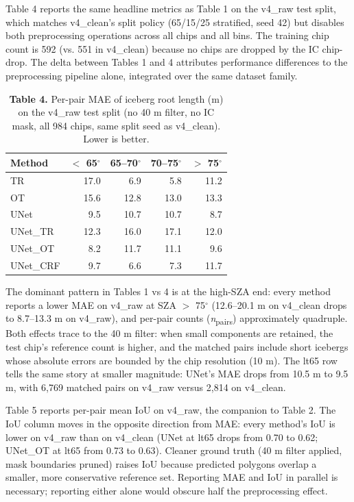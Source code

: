 \documentclass[review,jog]{igs}
\begin{document}
Table 4 reports the same headline metrics as Table 1 on the v4\_raw test split, which matches v4\_clean's split policy (65/15/25 stratified, seed 42) but disables both preprocessing operations across all chips and all bins. The training chip count is 592 (vs. 551 in v4\_clean) because no chips are dropped by the IC chip-drop. The delta between Tables 1 and 4 attributes performance differences to the preprocessing pipeline alone, integrated over the same dataset family.

\begin{table}[h]
\caption{\textbf{Table 4.} Per-pair MAE of iceberg root length (m) on the v4\_raw test split (no 40 m filter, no IC mask, all 984 chips, same split seed as v4\_clean). Lower is better.}
\centering
\begin{tabular}{lrrrr}
\toprule
Method & $<$ 65$^\circ$ & 65--70$^\circ$ & 70--75$^\circ$ & $>$ 75$^\circ$ \\
\midrule
TR        & 17.0           & 6.9            & 5.8            & 11.2 \\
OT        & 15.6           & 12.8           & 13.0           & 13.3 \\
UNet      & 9.5            & 10.7           & 10.7           & 8.7  \\
UNet\_TR  & 12.3           & 16.0           & 17.1           & 12.0 \\
UNet\_OT  & 8.2            & 11.7           & 11.1           & 9.6  \\
UNet\_CRF & 9.7            & 6.6            & 7.3            & 11.7 \\
\bottomrule
\end{tabular}
\end{table}

The dominant pattern in Tables 1 vs 4 is at the high-SZA end: every method reports a lower MAE on v4\_raw at SZA $>$ 75$^\circ$ (12.6--20.1 m on v4\_clean drops to 8.7--13.3 m on v4\_raw), and per-pair counts (\textit{n}\textsubscript{pairs}) approximately quadruple. Both effects trace to the 40 m filter: when small components are retained, the test chip's reference count is higher, and the matched pairs include short icebergs whose absolute errors are bounded by the chip resolution (10 m). The lt65 row tells the same story at smaller magnitude: UNet's MAE drops from 10.5 m to 9.5 m, with 6,769 matched pairs on v4\_raw versus 2,814 on v4\_clean.

Table 5 reports per-pair mean IoU on v4\_raw, the companion to Table 2. The IoU column moves in the opposite direction from MAE: every method's IoU is lower on v4\_raw than on v4\_clean (UNet at lt65 drops from 0.70 to 0.62; UNet\_OT at lt65 from 0.73 to 0.63). Cleaner ground truth (40 m filter applied, mask boundaries pruned) raises IoU because predicted polygons overlap a smaller, more conservative reference set. Reporting MAE and IoU in parallel is necessary; reporting either alone would obscure half the preprocessing effect.
\end{document}
